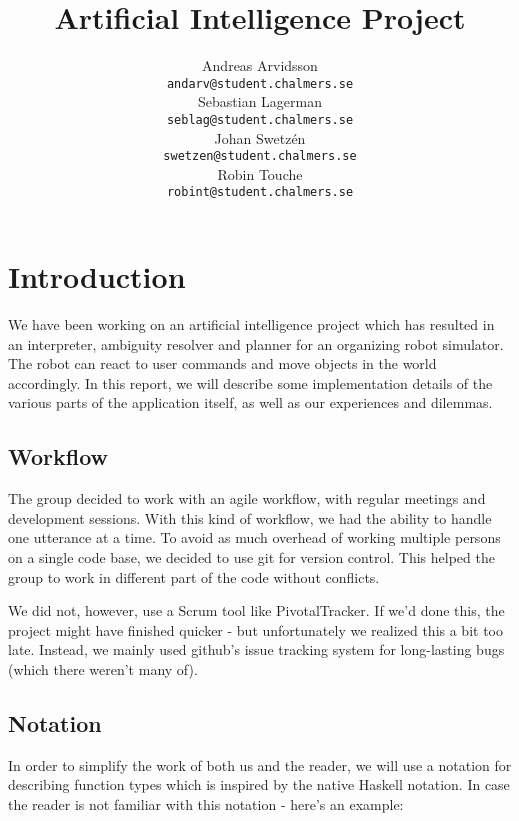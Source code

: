 \documentclass[11pt]{article}
\title{Artificial Intelligence Project}
\author{Andreas Arvidsson \\
  {\tt andarv@student.chalmers.se} \\
  Sebastian Lagerman \\
  {\tt seblag@student.chalmers.se} \\
  Johan Swetz\'{e}n \\
  {\tt swetzen@student.chalmers.se} \\
  Robin Touche \\
  {\tt robint@student.chalmers.se} \\}
\date{}
\begin{document}
\maketitle





\section*{Introduction}
We have been working on an artificial intelligence project which has resulted in an interpreter, ambiguity resolver and planner for an organizing robot simulator.
The robot can react to user commands and move objects in the world accordingly.
In this report, we will describe some implementation details of the various parts of the application itself, as well as our experiences and dilemmas.

\subsection*{Workflow}
The group decided to work with an agile workflow, with regular meetings and development sessions.
With this kind of workflow, we had the ability to handle one utterance at a time.
To avoid as much overhead of working multiple persons on a single code base, we decided to use git for version control.
This helped the group to work in different part of the code without conflicts.

We did not, however, use a Scrum tool like PivotalTracker. If we'd done this, the project might have finished quicker - but unfortunately we realized this a bit too late. Instead, we mainly used github's issue tracking system for long-lasting bugs (which there weren't many of).

\subsection*{Notation}
In order to simplify the work of both us and the reader, we will use a notation for describing function types which is inspired by the native Haskell notation.
In case the reader is not familiar with this notation - here's an example:
\end{document}
